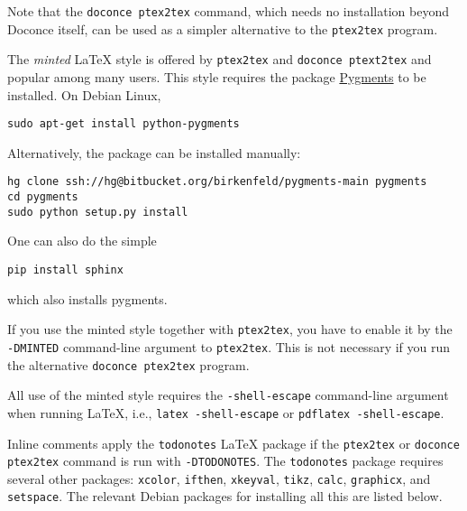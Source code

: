 \documentclass[%
oneside,                 %
final,                   %
10pt]{article}
\begin{document}
Note that the {\fontsize{10pt}{10pt}\Verb!doconce ptex2tex!} command, which needs no installation
beyond Doconce itself, can be used as a simpler alternative to the {\fontsize{10pt}{10pt}\Verb!ptex2tex!}
program.

The \emph{minted} {\LaTeX} style is offered by {\fontsize{10pt}{10pt}\Verb!ptex2tex!} and {\fontsize{10pt}{10pt}\Verb!doconce ptext2tex!}
and popular among many
users. This style requires the package \href{{http://pygments.org}}{Pygments}
to be installed. On Debian Linux,
\vspace{4pt}
\begin{Verbatim}[numbers=none,frame=lines,fontsize=\fontsize{9pt}{9pt},labelposition=topline,framesep=2.5mm,framerule=0.7pt]
sudo apt-get install python-pygments
\end{Verbatim}
Alternatively, the package can be installed manually:
\vspace{4pt}
\begin{Verbatim}[numbers=none,frame=lines,fontsize=\fontsize{9pt}{9pt},labelposition=topline,framesep=2.5mm,framerule=0.7pt]
hg clone ssh://hg@bitbucket.org/birkenfeld/pygments-main pygments
cd pygments
sudo python setup.py install
\end{Verbatim}
One can also do the simple

\vspace{4pt}
\begin{Verbatim}[numbers=none,frame=lines,fontsize=\fontsize{9pt}{9pt},labelposition=topline,framesep=2.5mm,framerule=0.7pt]
pip install sphinx
\end{Verbatim}
which also installs pygments.

If you use the minted style together with {\fontsize{10pt}{10pt}\Verb!ptex2tex!}, you have to
enable it by the {\fontsize{10pt}{10pt}\Verb!-DMINTED!} command-line argument to {\fontsize{10pt}{10pt}\Verb!ptex2tex!}.
This is not necessary if you run the alternative {\fontsize{10pt}{10pt}\Verb!doconce ptex2tex!} program.

All use of the minted style requires the {\fontsize{10pt}{10pt}\Verb!-shell-escape!} command-line
argument when running {\LaTeX}, i.e., {\fontsize{10pt}{10pt}\Verb!latex -shell-escape!} or {\fontsize{10pt}{10pt}\Verb!pdflatex -shell-escape!}.

Inline comments apply the {\fontsize{10pt}{10pt}\Verb!todonotes!} {\LaTeX} package if the {\fontsize{10pt}{10pt}\Verb!ptex2tex!}
or {\fontsize{10pt}{10pt}\Verb!doconce ptex2tex!} command is run with {\fontsize{10pt}{10pt}\Verb!-DTODONOTES!}.  The
{\fontsize{10pt}{10pt}\Verb!todonotes!} package requires several other packages: {\fontsize{10pt}{10pt}\Verb!xcolor!},
{\fontsize{10pt}{10pt}\Verb!ifthen!}, {\fontsize{10pt}{10pt}\Verb!xkeyval!}, {\fontsize{10pt}{10pt}\Verb!tikz!}, {\fontsize{10pt}{10pt}\Verb!calc!}, {\fontsize{10pt}{10pt}\Verb!graphicx!}, and {\fontsize{10pt}{10pt}\Verb!setspace!}. The
relevant Debian packages for installing all this are listed below.
\end{document}
